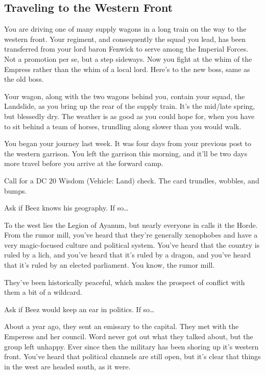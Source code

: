 \begin{multicols}{2}
\subsection{Traveling to the Western Front}
  \begin{aloud}
  You are driving one of many supply wagons in a long train on the way to the western front.
  Your regiment, and consequently the squad you lead, has been transferred from your lord baron
    Fenwick to serve among the Imperial Forces.
  Not a promotion per se, but a step sideways.
  Now you fight at the whim of the Empress rather than the whim of a local lord.
  Here's to the new boss, same as the old boss.

  Your wagon, along with the two wagons behind you, contain your squad, the Landslide, as you
    bring up the rear of the supply train.
  It's the mid/late spring, but blessedly dry.
  The weather is as good as you could hope for, when you have to sit behind a team of horses,
    trundling along slower than you would walk.

  You began your journey last week.
  It was four days from your previous post to the western garrison.
  You left the garrison this morning, and it'll be two days more travel before you arrive at the
    forward camp.
  \end{aloud}

Call for a DC 20 Wisdom (Vehicle: Land) check.
The card trundles, wobbles, and bumps.

Ask if Beez knows his geography.
If so\dots

  \begin{aloud}
  To the west lies the Legion of Ayanum, but nearly everyone in calls it the Horde.
  From the rumor mill, you've heard that they're generally xenophobes and have a very magic-focused
    culture and political system.
  You've heard that the country is ruled by a lich, and you've heard that it's ruled by a dragon,
    and you've heard that it's ruled by an elected parliament.
  You know, the rumor mill.

  They've been historically peaceful, which makes the prospect of conflict with them a bit of a
    wildcard.

  \end{aloud}

Ask if Beez would keep an ear in politics.
If so\dots

  \begin{aloud}
  About a year ago, they sent an emissary to the capital.
  They met with the Emperess and her council.
  Word never got out what they talked about, but the group left unhappy.
  Ever since then the military has been shoring up it's western front.
  You've heard that political channels are still open, but it's clear that things in the west are
    headed south, as it were.
  \end{aloud}


\end{multicols}

